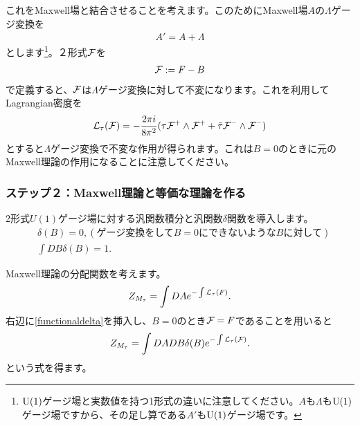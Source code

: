 \documentclass[generalized_symmetry.tex]{subfiles}
\begin{document}
これをMaxwell場と結合させることを考えます。このためにMaxwell場$A$の$\Lambda$ゲージ変換を
\begin{align}
  A' = A + \Lambda
\end{align}
とします\footnote{$\mbox{U}(1)$ゲージ場と実数値を持つ1形式の違いに注意してください。$A$も$\Lambda$も$\mbox{U}(1)$ゲージ場ですから、その足し算である$A'$も$\mbox{U}(1)$ゲージ場です。}。２形式$\mathcal{F}$を
\begin{align}
  \mathcal{F} := F-B 
\end{align}
で定義すると、$\mathcal{F}$は$\Lambda$ゲージ変換に対して不変になります。これを利用してLagrangian密度を
\begin{align}
  \mathcal{L}_{\tau}(\mathcal{F})=-\frac{2\pi i}{8\pi^2}(\tau \mathcal{F}^{+}\wedge \mathcal{F}^{+}+\bar{\tau} \mathcal{F}^{-}\wedge \mathcal{F}^{-})
\end{align}
とすると$\Lambda$ゲージ変換で不変な作用が得られます。これは$B=0$のときに元のMaxwell理論の作用になることに注意してください。

\subsubsection{ステップ２：Maxwell理論と等価な理論を作る}
2形式$U(1)$ゲージ場に対する汎関数積分と汎関数$\delta$関数を導入します。
\begin{align}
  &\delta(B)=0, (\text{ゲージ変換をして$B=0$にできないような$B$に対して})\\
  &\int DB \delta(B)=1.\label{functionaldelta}
\end{align}

Maxwell理論の分配関数を考えます。
\begin{align}
  Z_{M_{\tau}}= \int DA e^{-\int \mathcal{L}_{\tau}(F)}.
\end{align}
右辺に\eqref{functionaldelta}を挿入し、$B=0$のとき$\mathcal{F}=F$であることを用いると
\begin{align}
  Z_{M_{\tau}}= \int DA DB \delta(B) e^{-\int \mathcal{L}_{\tau}(\mathcal{F})}.\label{MaxwellDualTemp1}
\end{align}
という式を得ます。
\end{document}
